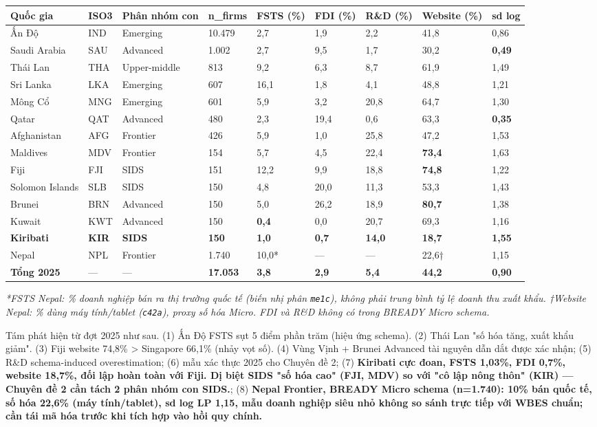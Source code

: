 \documentclass[12pt,a4paper]{article}
\begin{document}
\begin{longtable}[]{@{}lllllllll@{}}
\toprule\noalign{}
Quốc gia & ISO3 & Phân nhóm con & n\_firms & FSTS (\%) & FDI (\%) & R\&D
(\%) & Website (\%) & sd log \\
\midrule\noalign{}
\endhead
\bottomrule\noalign{}
\endlastfoot
Ấn Độ & IND & Emerging & 10.479 & 2,7 & 1,9 & 2,2 & 41,8 & 0,86 \\
Saudi Arabia & SAU & Advanced & 1.002 & 2,7 & 9,5 & 1,7 & 30,2 &
\textbf{0,49} \\
Thái Lan & THA & Upper-middle & 813 & 9,2 & 6,3 & 8,7 & 61,9 & 1,49 \\
Sri Lanka & LKA & Emerging & 607 & 16,1 & 1,8 & 4,1 & 48,8 & 1,21 \\
Mông Cổ & MNG & Emerging & 601 & 5,9 & 3,2 & 20,8 & 64,7 & 1,30 \\
Qatar & QAT & Advanced & 480 & 2,3 & 19,4 & 0,6 & 63,3 &
\textbf{0,35} \\
Afghanistan & AFG & Frontier & 426 & 5,9 & 1,0 & 25,8 & 47,2 & 1,53 \\
Maldives & MDV & Frontier & 154 & 5,7 & 4,5 & 22,4 & \textbf{73,4} &
1,63 \\
Fiji & FJI & SIDS & 151 & 12,2 & 9,9 & 18,8 & \textbf{74,8} & 1,22 \\
Solomon Islands & SLB & SIDS & 150 & 4,8 & 20,0 & 11,3 & 53,3 & 1,43 \\
Brunei & BRN & Advanced & 150 & 5,0 & 26,2 & 18,9 & \textbf{80,7} &
1,38 \\
Kuwait & KWT & Advanced & 150 & \textbf{0,4} & 0,0 & 20,7 & 69,3 &
1,16 \\
\textbf{Kiribati} & \textbf{KIR} & \textbf{SIDS} & \textbf{150} &
\textbf{1,0} & \textbf{0,7} & \textbf{14,0} & \textbf{18,7} &
\textbf{1,55} \\
Nepal & NPL & Frontier & 1.740 & 10,0* & --- & --- & 22,6† & 1,15 \\
\textbf{Tổng 2025} & --- & --- & \textbf{17.053} & \textbf{3,8} &
\textbf{2,9} & \textbf{5,4} & \textbf{44,2} & \textbf{0,90} \\
\end{longtable}

\emph{*FSTS Nepal: \% doanh nghiệp bán ra thị trường quốc tế (biến nhị
phân \texttt{me1c}), không phải trung bình tỷ lệ doanh thu xuất khẩu.
†Website Nepal: \% dùng máy tính/tablet (\texttt{c42a}), proxy số hóa
Micro. FDI và R\&D không có trong BREADY Micro schema.}

Tám phát hiện từ đợt 2025 như sau. (1) Ấn Độ FSTS sụt 5 điểm phần trăm
(hiệu ứng schema). (2) Thái Lan "số hóa tăng, xuất khẩu giảm". (3) Fiji
website 74,8\% \textgreater{} Singapore 66,1\% (nhảy vọt số). (4) Vùng
Vịnh + Brunei Advanced tài nguyên dẫn dắt được xác nhận; (5) R\&D
schema-induced overestimation; (6) mẫu xác thực 2025 cho Chuyên đề 2;
(7) \textbf{Kiribati cực đoan, FSTS 1,03\%, FDI 0,7\%, website 18,7\%,
đối lập hoàn toàn với Fiji. Dị biệt SIDS "số hóa cao" (FJI, MDV) so với
"cô lập nông thôn" (KIR) --- Chuyên đề 2 cần tách 2 phân nhóm con
SIDS.}; (8) \textbf{Nepal Frontier, BREADY Micro schema (n=1.740): 10\%
bán quốc tế, số hóa 22,6\% (máy tính/tablet), sd log LP 1,15, mẫu doanh
nghiệp siêu nhỏ không so sánh trực tiếp với WBES chuẩn; cần tái mã hóa
trước khi tích hợp vào hồi quy chính.}
\end{document}
